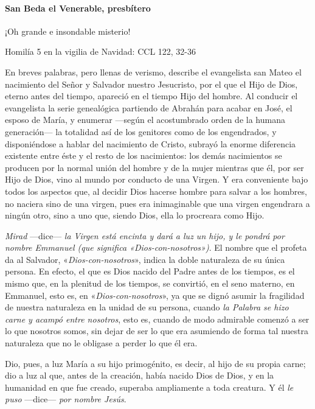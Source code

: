 \documentclass[]{article}
\let\oldparagraph\paragraph
\renewcommand{\paragraph}[1]{\oldparagraph{#1}\mbox{}}
\begin{document}
\paragraph{San Beda el Venerable,
presbítero}\label{san-beda-el-venerable-presbuxedtero}

¡Oh grande e insondable misterio!

Homilía 5 en la vigilia de Navidad: CCL 122, 32-36

En breves palabras, pero llenas de verismo, describe el evangelista san
Mateo el nacimiento del Señor y Salvador nuestro Jesucristo, por el que
el Hijo de Dios, eterno antes del tiempo, apareció en el tiempo Hijo del
hombre. Al conducir el evangelista la serie genealógica partiendo de
Abrahán para acabar en José, el esposo de María, y enumerar ---según el
acostumbrado orden de la humana generación--- la totalidad así de los
genitores como de los engendrados, y disponiéndose a hablar del
nacimiento de Cristo, subrayó la enorme diferencia existente entre éste
y el resto de los nacimientos: los demás nacimientos se producen por la
normal unión del hombre y de la mujer mientras que él, por ser Hijo de
Dios, vino al mundo por conducto de una Virgen. Y era conveniente bajo
todos los aspectos que, al decidir Dios hacerse hombre para salvar a los
hombres, no naciera sino de una virgen, pues era inimaginable que una
virgen engendrara a ningún otro, sino a uno que, siendo Dios, ella lo
procreara como Hijo.

\emph{Mirad} ---dice--- \emph{la Virgen está encinta y dará a luz un
hijo, y le pondrá por nombre Emmanuel (que significa
«Dios-con-nosotros»)}. El nombre que el profeta da al Salvador,
«\emph{Dios-con-nosotros}», indica la doble naturaleza de su única
persona. En efecto, el que es Dios nacido del Padre antes de los
tiempos, es el mismo que, en la plenitud de los tiempos, se convirtió,
en el seno materno, en Emmanuel, esto es, en «\emph{Dios-con-nosotros}»,
ya que se dignó asumir la fragilidad de nuestra naturaleza en la unidad
de su persona, cuando \emph{la Palabra se hizo carne y acampó entre
nosotros}, esto es, cuando de modo admirable comenzó a ser lo que
nosotros somos, sin dejar de ser lo que era asumiendo de forma tal
nuestra naturaleza que no le obligase a perder lo que él era.

Dio, pues, a luz María a su hijo primogénito, es decir, al hijo de su
propia carne; dio a luz al que, antes de la creación, había nacido Dios
de Dios, y en la humanidad en que fue creado, superaba ampliamente a
toda creatura. Y él \emph{le puso} ---dice--- \emph{por nombre Jesús}.
\end{document}
